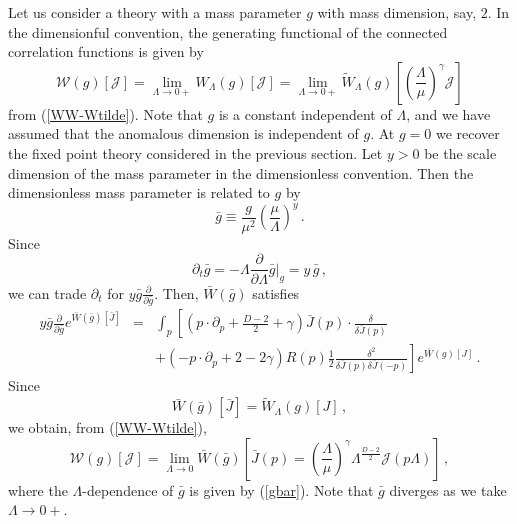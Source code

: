 \documentclass[aps,prd,preprint,groupedaddress,preprintnumbers,longbibliography]{revtex4-1}
\newcommand{\nn}{\nonumber}
\newcommand{\WW}{\mathcal{W}}
\newcommand{\JJ}{\mathcal{J}}
\begin{document}
Let us consider a theory with a mass parameter $g$ with mass
dimension, say, $2$.  In the dimensionful convention, the generating
functional of the connected correlation functions is given by
\begin{equation}
\WW (g) [\JJ] = \lim_{\Lambda \to 0+} W_\Lambda (g) [\JJ] =
\lim_{\Lambda \to 0+} \tilde{W}_\Lambda (g) \left[
  \left(\frac{\Lambda}{\mu}\right)^\gamma \JJ \right]
\end{equation}
from (\ref{WW-Wtilde}).  Note that $g$ is a constant independent of
$\Lambda$, and we have assumed that the anomalous dimension is
independent of $g$.  At $g=0$ we recover the fixed point theory
considered in the previous section.  Let $y > 0$ be the scale
dimension of the mass parameter in the dimensionless convention.  Then 
the dimensionless mass parameter is related to $g$ by
\begin{equation}
\bar{g} \equiv \frac{g}{\mu^2} \left(\frac{\mu}{\Lambda}\right)^y\,.
\label{gbar}
\end{equation}
Since
\begin{equation}
\partial_t \bar{g} = - \Lambda \frac{\partial}{\partial \Lambda}
\bar{g}\Big|_g = y\, \bar{g}\,,
\end{equation}
we can trade $\partial_t$ for $y \bar{g} \frac{\partial}{\partial
  \bar{g}}$. Then, $\bar{W} (\bar{g})$ satisfies
\begin{eqnarray}
y \bar{g} \frac{\partial}{\partial \bar{g}} e^{\bar{W} (\bar{g})[\bar{J}]}
&=& \int_p \left[ \left( p \cdot \partial_p + \frac{D-2}{2} +
  \gamma \right) \bar{J} (p) \cdot
\frac{\delta}{\delta \bar{J} (p)} \right. \nn\\
&&\left. + \left( - p \cdot \partial_p + 2 - 2
  \gamma \right) R(p)  \frac{1}{2} \frac{\delta^2}{\delta
  \bar{J} (p) \delta \bar{J} (-p)} \right] e^{\bar{W}(g) [J]}\,.
\end{eqnarray}
Since
\begin{equation}
\bar{W} (\bar{g}) [\bar{J}] = \tilde{W}_\Lambda (g) [J]\,,
\end{equation}
we obtain, from (\ref{WW-Wtilde}),
\begin{equation}
\WW (g) [\JJ] = \lim_{\Lambda \to 0} \bar{W} (\bar{g})
 \left[ \bar{J} (p) = \left(\frac{\Lambda}{\mu}\right)^\gamma
   \Lambda^{\frac{D-2}{2}} \JJ (p \Lambda) \right]\,,\label{massive}
\end{equation}
where the $\Lambda$-dependence of $\bar{g}$ is given by (\ref{gbar}).
Note that $\bar{g}$ diverges as we take $\Lambda \to 0+$.
\end{document}
